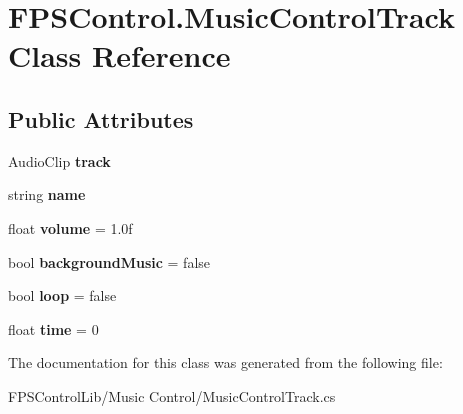\hypertarget{class_f_p_s_control_1_1_music_control_track}{\section{F\-P\-S\-Control.\-Music\-Control\-Track Class Reference}
\label{class_f_p_s_control_1_1_music_control_track}
}
\subsection*{Public Attributes}
\begin{DoxyCompactItemize}
\item 
\hypertarget{class_f_p_s_control_1_1_music_control_track_a5915272bc8885da976db3ffc17bad8d8}{Audio\-Clip {\bfseries track}}\label{class_f_p_s_control_1_1_music_control_track_a5915272bc8885da976db3ffc17bad8d8}

\item 
\hypertarget{class_f_p_s_control_1_1_music_control_track_ae6f0029b25750db038fee265bf742863}{string {\bfseries name}}\label{class_f_p_s_control_1_1_music_control_track_ae6f0029b25750db038fee265bf742863}

\item 
\hypertarget{class_f_p_s_control_1_1_music_control_track_a114e823d6a6ea20df05920bfef9c45ca}{float {\bfseries volume} = 1.\-0f}\label{class_f_p_s_control_1_1_music_control_track_a114e823d6a6ea20df05920bfef9c45ca}

\item 
\hypertarget{class_f_p_s_control_1_1_music_control_track_a6b451e0417a5223c97785bf6dcb7c253}{bool {\bfseries background\-Music} = false}\label{class_f_p_s_control_1_1_music_control_track_a6b451e0417a5223c97785bf6dcb7c253}

\item 
\hypertarget{class_f_p_s_control_1_1_music_control_track_ad5348bb76a8cc8614414a7f037d3bade}{bool {\bfseries loop} = false}\label{class_f_p_s_control_1_1_music_control_track_ad5348bb76a8cc8614414a7f037d3bade}

\item 
\hypertarget{class_f_p_s_control_1_1_music_control_track_abfee5ff7177d2468a509f308a80a0996}{float {\bfseries time} = 0}\label{class_f_p_s_control_1_1_music_control_track_abfee5ff7177d2468a509f308a80a0996}

\end{DoxyCompactItemize}


The documentation for this class was generated from the following file\-:\begin{DoxyCompactItemize}
\item 
F\-P\-S\-Control\-Lib/\-Music Control/Music\-Control\-Track.\-cs\end{DoxyCompactItemize}
